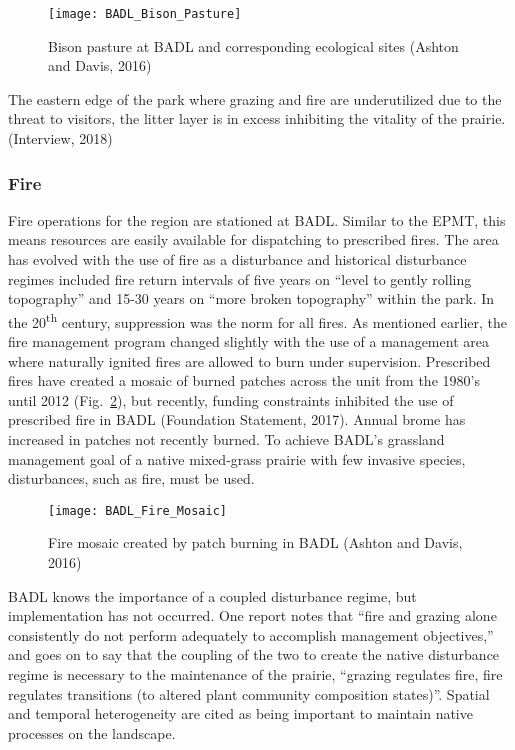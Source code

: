 \begin{figure}
	\centering
\texttt{[image: BADL\_Bison\_Pasture]}
\caption{Bison pasture at BADL and corresponding ecological sites (Ashton and Davis, 2016)} 
\label{fig:BADLbison}
\end{figure}

The eastern edge of the park where grazing and fire are underutilized due to the threat to visitors, the litter layer is in excess inhibiting the vitality of the prairie. (Interview, 2018)

\subsubsection{Fire }

Fire operations for the region are stationed at BADL.
Similar to the EPMT, this means resources are easily available for dispatching to prescribed fires. 
The area has evolved with the use of fire as a disturbance and historical disturbance regimes included fire return
intervals of five years on ``level to gently rolling topography'' and 15-30 years on ``more broken topography'' within the park. 
In the 20\textsuperscript{th} century, suppression was the norm for all fires.
As mentioned earlier, the fire management program changed slightly with the use of a management area where naturally ignited fires are allowed to burn under supervision.
Prescribed fires have created a mosaic of burned patches across the unit from the 1980's until 2012 (Fig.~\ref{fig:BADLfire}), but recently, funding constraints inhibited the use of prescribed fire in BADL (Foundation Statement, 2017). 
Annual brome has increased in patches not recently burned. 
To achieve BADL's grassland management goal of a native mixed-grass prairie with few invasive species, disturbances, such as fire, must be used.

\begin{figure} 
\centering
\texttt{[image: BADL\_Fire\_Mosaic]}
\caption{Fire mosaic created by patch burning in BADL (Ashton and Davis,
2016)}
\label{fig:BADLfire}
\end{figure}

BADL knows the importance of a coupled disturbance regime, but implementation has not occurred. 
One report notes that ``fire and grazing alone consistently do not perform adequately to accomplish management objectives,'' and goes on to say that the coupling of the two to create the native disturbance regime is necessary to the maintenance of the prairie, ``grazing regulates fire, fire regulates transitions (to altered plant community composition states)''. 
Spatial and temporal heterogeneity are cited as being important to maintain native processes on the landscape.

